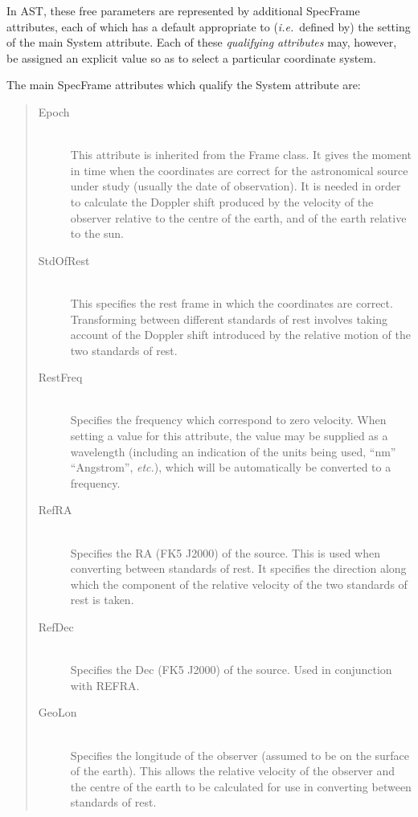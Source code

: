 \documentclass[twoside,11pt]{article}
\begin{document}
In AST, these free parameters are represented by additional SpecFrame
attributes, each of which has a default appropriate to
({\em{i.e.}}\ defined by) the setting of the main System
attribute. Each of these {\em{qualifying attributes}} may, however, be
assigned an explicit value so as to select a particular coordinate
system.

The main SpecFrame attributes which qualify the System attribute are:

\begin{quote}
\begin{description}

\item[Epoch]\mbox{}\\
This attribute is inherited from the Frame class. It gives the moment in
time when the coordinates are correct for the astronomical source
under study (usually the date of observation). It is needed in order to 
calculate the Doppler shift produced by the velocity of the observer
relative to the centre of the earth, and of the earth relative to the sun.

\item[StdOfRest]\mbox{}\\
This specifies the rest frame in which the coordinates are correct.
Transforming between different standards of rest involves taking account
of the Doppler shift introduced by the relative motion of the two
standards of rest. 

\item[RestFreq]\mbox{}\\
Specifies the frequency which correspond to zero velocity. When setting a
value for this attribute, the value may be supplied as a wavelength
(including an indication of the units being used, ``nm'' ``Angstrom'',
\emph{etc.}), which will be automatically be converted to a frequency.

\item[RefRA]\mbox{}\\
Specifies the RA (FK5 J2000) of the source. This is used when converting
between standards of rest. It specifies the direction along which the
component of the relative velocity of the two standards of rest is taken.

\item[RefDec]\mbox{}\\
Specifies the Dec (FK5 J2000) of the source. Used in conjunction with
REFRA.

\item[GeoLon]\mbox{}\\
Specifies the longitude of the observer (assumed to be on the surface of
the earth). This allows the relative velocity of the observer and the
centre of the earth to be calculated for use in converting between
standards of rest.


\end{description}
\end{quote}
\end{document}

